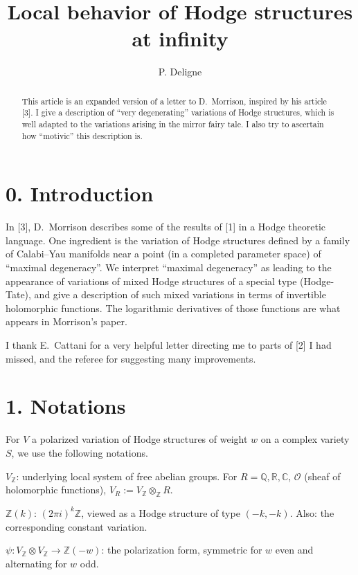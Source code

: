 \documentclass[11pt,a4paper]{article}
\title{Local behavior of Hodge structures at infinity}
\author{P. Deligne}
\date{}
\theoremstyle{plain}
\theoremstyle{definition}
\begin{document}
\maketitle

\begin{abstract}
This article is an expanded version of a letter to D.~Morrison, inspired by his article [3]. I give a description of ``very degenerating'' variations of Hodge structures, which is well adapted to the variations arising in the mirror fairy tale. I also try to ascertain how ``motivic'' this description is.
\end{abstract}

\section*{0. Introduction}

In [3], D.~Morrison describes some of the results of [1] in a Hodge theoretic language. One ingredient is the variation of Hodge structures defined by a family of Calabi--Yau manifolds near a point (in a completed parameter space) of ``maximal degeneracy''. We interpret ``maximal degeneracy'' as leading to the appearance of variations of mixed Hodge structures of a special type (Hodge-Tate), and give a description of such mixed variations in terms of invertible holomorphic functions. The logarithmic derivatives of those functions are what appears in Morrison's paper.

I thank E.~Cattani for a very helpful letter directing me to parts of [2] I had missed, and the referee for suggesting many improvements.

\section{1. Notations}

For $V$ a polarized variation of Hodge structures of weight $w$ on a complex variety $S$, we use the following notations.

$V_{\mathbb{Z}}$: underlying local system of free abelian groups. For $R = \mathbb{Q}, \mathbb{R}, \mathbb{C}$, $\mathcal{O}$ (sheaf of holomorphic functions), $V_{R} := V_{\mathbb{Z}} \otimes_{\mathbb{Z}} R$.

$\mathbb{Z}(k)$: $(2\pi i)^{k}\mathbb{Z}$, viewed as a Hodge structure of type $(-k,-k)$. Also: the corresponding constant variation.

$\psi: V_{\mathbb{Z}} \otimes V_{\mathbb{Z}} \to \mathbb{Z}(-w)$: the polarization form, symmetric for $w$ even and alternating for $w$ odd.
\end{document}
